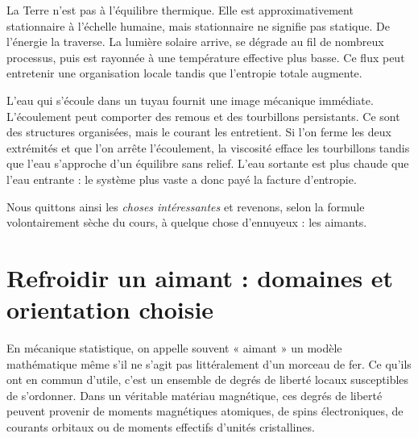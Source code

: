 La Terre n’est pas à l’équilibre thermique. Elle est approximativement stationnaire à l’échelle humaine, mais stationnaire ne signifie pas statique. De l’énergie la traverse. La lumière solaire arrive, se dégrade au fil de nombreux processus, puis est rayonnée à une température effective plus basse. Ce flux peut entretenir une organisation locale tandis que l’entropie totale augmente.

L’eau qui s’écoule dans un tuyau fournit une image mécanique immédiate. L’écoulement peut comporter des remous et des tourbillons persistants. Ce sont des structures organisées, mais le courant les entretient. Si l’on ferme les deux extrémités et que l’on arrête l’écoulement, la viscosité efface les tourbillons tandis que l’eau s’approche d’un équilibre sans relief. L’eau sortante est plus chaude que l’eau entrante : le système plus vaste a donc payé la facture d’entropie.

\begin{classroomqa}
\end{classroomqa}

Nous quittons ainsi les \emph{choses intéressantes} et revenons, selon la formule volontairement sèche du cours, à quelque chose d’ennuyeux : les aimants.

\section{Refroidir un aimant : domaines et orientation choisie}

En mécanique statistique, on appelle souvent « aimant » un modèle mathématique même s’il ne s’agit pas littéralement d’un morceau de fer. Ce qu’ils ont en commun d’utile, c’est un ensemble de degrés de liberté locaux susceptibles de s’ordonner. Dans un véritable matériau magnétique, ces degrés de liberté peuvent provenir de moments magnétiques atomiques, de spins électroniques, de courants orbitaux ou de moments effectifs d’unités cristallines.

